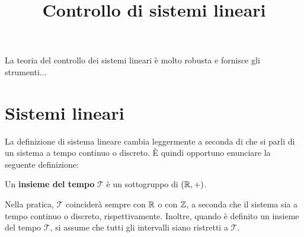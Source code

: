 \title{Controllo di sistemi lineari}
\maketitle
\label{sec:linear-systems-and-control}

La teoria del controllo dei sistemi lineari è molto robusta e fornisce gli
strumenti... 

\iffalse
\section{Sistemi lineari}
La definizione di sistema lineare cambia leggermente a seconda di che si parli
di un sistema a tempo continuo o discreto.
È quindi opportuno enunciare la seguente definizione:

\begin{definition}
    Un \textbf{insieme del tempo} $\mathcal T$ è un sottogruppo di $(\mathbb{R}, +)$.
\end{definition}
Nella pratica, $\mathcal T$ coinciderà sempre con $\mathbb{R}$ o con $\mathbb{Z}$, a seconda
che il sistema sia a tempo continuo o discreto, rispettivamente.
Inoltre, quando è definito un insieme del tempo $\mathcal T$, si assume che tutti gli
intervalli siano ristretti a $\mathcal T$.

